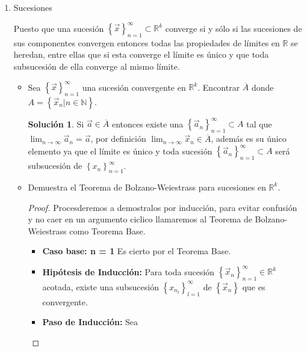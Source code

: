 \documentclass[letterpaper]{article}
\theoremstyle{definition}
\theoremstyle{lemathm}
\theoremstyle{lemathm}
\newtheorem{sol}{Solución}
\theoremstyle{lemathm}
\theoremstyle{lemademthm}
\newcommand{\limtoinf}[1]{\lim_{#1\to\infty}}
\newcommand{\pars}[1]{\left( #1 \right) }
\newcommand{\set}[1]{\left \{ #1 \right\} }
\newcommand{\NN}{\mathbb{N}}
\newcommand{\RR}{\mathbb{R}}
\newcommand{\1}{\mathbbm{1}}
\begin{document}
\begin{enumerate}
\begin{itemize}
\begin{proof}
				\[d\pars{\vec{x},A} \leq d\pars{\vec{x}, \overline{A}}.\]
	
				Por lo tanto concluimos que
	
				\[d\pars{\vec{x},A} = d\pars{\vec{x},\overline{A}}.\]

			\end{proof}

		\end{itemize}

		\item Sucesiones
		
		Puesto que una sucesión $\set{\vec{x}}_{n=1}^{\infty} \subset \RR^k$ converge si y sólo si las sucesiones de sus componentes convergen entonces todas las propiedades de límites en $\RR$ se heredan, entre ellas que si esta converge el límite es único y que toda subsucesión de ella converge al mismo límite. 

		\begin{itemize}
			\item Sea $\set{\vec{x}}_{n=1}^{\infty}$ una sucesión convergente en $\RR^k$. Encontrar $\overline{A}$ donde $A = \set{\vec{x}_n|n\in\NN}$.
			
			\begin{sol}

				 Si $\vec{a}\in \overline{A}$ entonces existe una $\set{\vec{a}_n}_{n=1}^{\infty} \subset A$ tal que $\limtoinf{n} \vec{a}_n = \vec{a}$, por definición $\limtoinf{n}\vec{x}_n \in \overline{A}$, además es su único elemento ya que el límite es único y toda sucesión $\set{\vec{a}_n}_{n=1}^{\infty} \subset A$ será subsucesión de $\set{x_n}_{n=1}^{\infty}$.

			\end{sol}

			\item Demuestra el Teorema de Bolzano-Weiestrass para sucesiones en $\RR^k$.
			
			\begin{proof}
				
				Procesderemos a demostralos por inducción, para evitar confusión y no caer en un argumento ciclico llamaremos al Teorema de Bolzano-Weiestrass como Teorema Base. 
	
				\begin{itemize}
					\item \textbf{Caso base: n = 1} Es cierto por el Teorema Base.
					\item \textbf{Hipótesis de Inducción:} Para toda sucesión $\set{\vec{x}_n}_{n=1}^{\infty} \in \RR^k$ acotada, existe una subsucesión $\set{x_{n_{l}}}_{l=1}^{\infty}$ de $\set{\vec{x}_n}$ que es convergente.
					\item \textbf{Paso de Inducción:} Sea 
					

\end{itemize}
\end{proof}
\end{itemize}
\end{enumerate}
\end{document}
